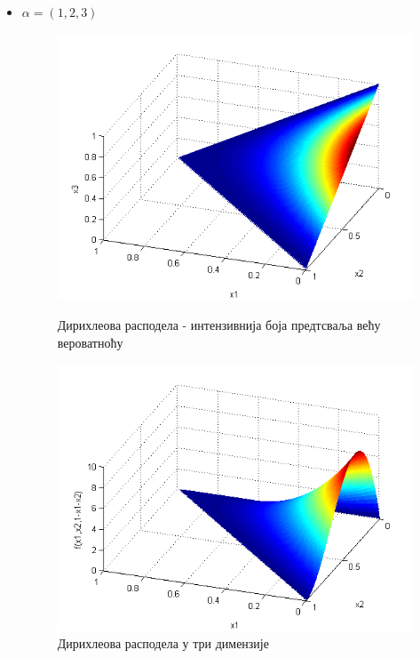 \begin{itemize}
\item $\alpha = (1,2,3)$
\begin{figure}[H]
  \includegraphics[scale=0.4]{./Slike/slika31.png} 
  \caption{Дирихлеова расподела - интензивнија боја предтсваља већу вероватноћу}\label{fig:slika25}
\endminipage\hfill
{}
  \includegraphics[scale=0.4]{./Slike/slika32.png} 
  \caption{Дирихлеова расподела у три димензије}\label{fig:slika26}
\endminipage\hfill


\end{figure}
\end{itemize}
